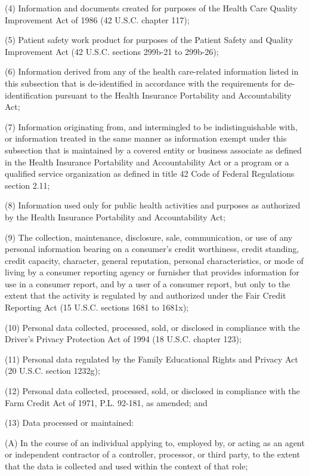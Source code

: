      (4)  Information and documents created for purposes of the Health Care Quality Improvement Act of 1986 (42 U.S.C. chapter 117);

     (5)  Patient safety work product for purposes of the Patient Safety and Quality Improvement Act (42 U.S.C. sections 299b-21 to 299b-26);

     (6)  Information derived from any of the health care-related information listed in this subsection that is de-identified in accordance with the requirements for de-identification pursuant to the Health Insurance Portability and Accountability Act;

     (7)  Information originating from, and intermingled to be indistinguishable with, or information treated in the same manner as information exempt under this subsection that is maintained by a covered entity or business associate as defined in the Health Insurance Portability and Accountability Act or a program or a qualified service organization as defined in title 42 Code of Federal Regulations section 2.11;

     (8)  Information used only for public health activities and purposes as authorized by the Health Insurance Portability and Accountability Act;

     (9)  The collection, maintenance, disclosure, sale, communication, or use of any personal information bearing on a consumer's credit worthiness, credit standing, credit capacity, character, general reputation, personal characteristics, or mode of living by a consumer reporting agency or furnisher that provides information for use in a consumer report, and by a user of a consumer report, but only to the extent that the activity is regulated by and authorized under the Fair Credit Reporting Act (15 U.S.C. sections 1681 to 1681x);

    (10)  Personal data collected, processed, sold, or disclosed in compliance with the Driver's Privacy Protection Act of 1994 (18 U.S.C. chapter 123);

    (11)  Personal data regulated by the Family Educational Rights and Privacy Act (20 U.S.C. section 1232g);

    (12)  Personal data collected, processed, sold, or disclosed in compliance with the Farm Credit Act of 1971, P.L. 92-181, as amended; and

    (13)  Data processed or maintained:

          (A)  In the course of an individual applying to, employed by, or acting as an agent or independent contractor of a controller, processor, or third party, to the extent that the data is collected and used within the context of that role;

